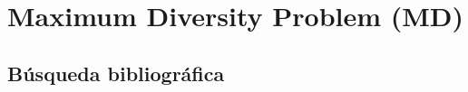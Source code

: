 \documentclass[13pt,a4paper]{article}
\begin{document}
    
    
    \newpage


\section{Maximum Diversity Problem (MD)}

\subsection{Búsqueda bibliográfica}

\end{document}
